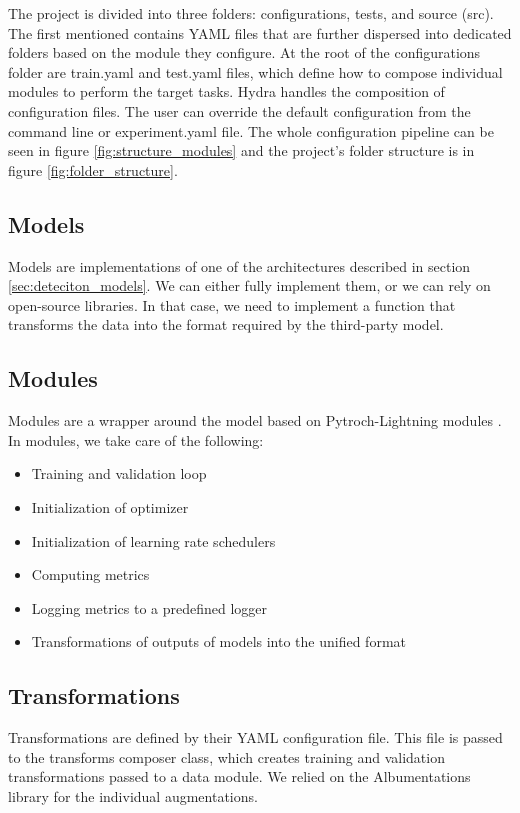 The project is divided into three folders: configurations, tests, and source (src). The first mentioned contains YAML files that are further dispersed into dedicated folders based on the module they configure. At the root of the configurations folder are train.yaml and test.yaml files, which define how to compose individual modules to perform the target tasks. Hydra \cite{Yadan2019Hydra} handles the composition of configuration files. The user can override the default configuration from the command line or experiment.yaml file. The whole configuration pipeline can be seen in figure \ref{fig:structure_modules} and the project's folder structure is in figure \ref{fig:folder_structure}.



\subsection{Models}
Models are implementations of one of the architectures described in section \ref{sec:deteciton_models}. We can either fully implement them, or we can rely on open-source libraries. In that case, we need to implement a function that transforms the data into the format required by the third-party model.

\subsection{Modules}
Modules are a wrapper around the model based on Pytroch-Lightning modules \cite{falcon2019pytorch}. In modules, we take care of the following:
\begin{itemize}
    \item Training and validation loop
    \item Initialization of optimizer
    \item Initialization of learning rate schedulers
    \item Computing metrics
    \item Logging metrics to a predefined logger
    \item Transformations of outputs of models into the unified format
\end{itemize}


\subsection{Transformations}
Transformations are defined by their YAML configuration file. This file is passed to the transforms composer class, which creates training and validation transformations passed to a data module. We relied on the Albumentations library for the individual augmentations.

